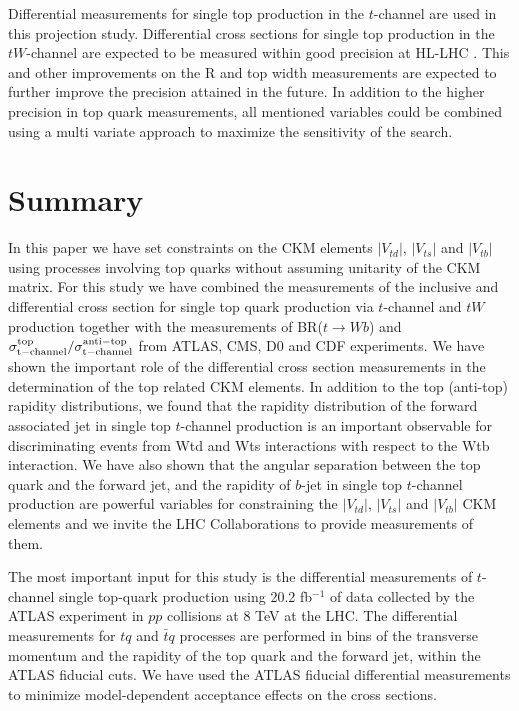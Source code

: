 \documentclass[11pt]{article}
\newcommand{\VTD}{|V_{td}|}
\newcommand{\VTS}{|V_{ts}|}
\newcommand{\VTB}{|V_{tb}|}
\begin{document}
Differential measurements for single top production in the $t$-channel are used in this projection study. Differential cross sections for single top production in the $tW$-channel are expected to be measured within good precision at HL-LHC \cite{Aaboud:2017qyi}.  This and other improvements on the R and top width measurements are expected to further improve the  precision attained in the future.
In addition to the higher precision in top quark measurements, all mentioned variables could be combined using a multi variate approach to maximize the sensitivity of the search.

\clearpage

\section{Summary}
In this paper we have set constraints on the CKM elements $\VTD$, $\VTS$ and $\VTB$ using processes involving top quarks without assuming unitarity of the CKM matrix.
For this study we have combined the measurements of the  inclusive and differential cross section for single top quark production via $t$-channel and $tW$ production together with the measurements of  BR($t \rightarrow Wb$) and $\sigma_{\rm t-channel}^{\rm top} / \sigma_{\rm t-channel}^{\rm anti-top}$ from ATLAS, CMS, D0 and CDF experiments.
We have shown  the important role of the differential cross section measurements in the determination of the top related CKM elements. In addition to the top (anti-top) rapidity distributions, we found that the rapidity distribution of the forward associated jet in single top $t$-channel production is an important  observable for discriminating events from Wtd and Wts interactions with respect to the Wtb interaction.
We have also shown that the angular separation between the top quark and the forward jet, and the rapidity of $b$-jet in single top $t$-channel production are powerful variables  for constraining the $\VTD$, $\VTS$ and $\VTB$  CKM elements and we invite the LHC Collaborations to provide measurements of them.

The most important input for this study  is the differential measurements of $t$-channel single top-quark production using 20.2 fb$^{-1}$ of data collected by the ATLAS experiment in $pp$
collisions at 8 TeV at the LHC. The differential measurements for $tq$ and $\bar{t}q$ processes are performed in bins of the transverse momentum and the rapidity of the top quark and the forward jet, within the ATLAS fiducial cuts. We have used the ATLAS fiducial differential measurements to minimize model-dependent acceptance effects on the cross sections.
\end{document}
